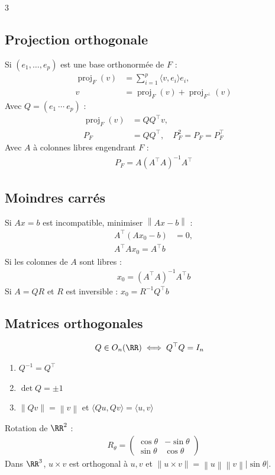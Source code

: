 \documentclass[12pt, a4paper]{article}
\newcommand{\proj}{\operatorname{proj}}
\newcommand{\norm}[1]{\left\lVert #1\right\rVert}
\begin{document}
\begin{multicols*}{3}
\colbreak
\subsection{Projection orthogonale}
Si $(e_1,\ldots,e_p)$ est une base orthonormée de $F$ :
\begin{align*}
\proj_F(v)&=\sum_{i=1}^p\langle v,e_i\rangle e_i,\\
v&=\proj_F(v)+\proj_{F^\perp}(v)
\end{align*}
Avec $Q=(e_1\ \cdots\ e_p)$ :
\begin{align*}
\proj_F(v)&=QQ^\top v,\\
P_F&=QQ^\top,\quad P_F^2=P_F=P_F^\top
\end{align*}
Avec $A$ à colonnes libres engendrant $F$ :
\begin{align*}
P_F=A(A^\top A)^{-1}A^\top
\end{align*}

\subsection{Moindres carrés}
Si $Ax=b$ est incompatible, minimiser $\norm{Ax-b}$ :
\begin{align*}
A^\top(Ax_0-b)&=0,\\
\boxed{A^\top Ax_0=A^\top b}
\end{align*}
Si les colonnes de $A$ sont libres :
\begin{align*}
x_0=(A^\top A)^{-1}A^\top b
\end{align*}
Si $A=QR$ et $R$ est inversible : $x_0=R^{-1}Q^\top b$

\subsection{Matrices orthogonales}
\vspace{-2em}
\begin{align*}
Q\in O_n(\RR)&\iff Q^\top Q=I_n
\end{align*}
\begin{enumerate}
\item $Q^{-1}=Q^\top$
\item $\det Q=\pm1$
\item $\norm{Qv}=\norm v$ et $\langle Qu,Qv\rangle=\langle u,v\rangle$
\end{enumerate}
Rotation de $\RR^2$ :
\begin{align*}
R_\theta=\begin{pmatrix}\cos\theta&-\sin\theta\\
\sin\theta&\cos\theta\end{pmatrix}
\end{align*}
Dans $\RR^3$, $u\times v$ est orthogonal à $u,v$ et $\norm{u\times v}=\norm u\norm v|\sin\theta|$.


\end{multicols*}
\end{document}
